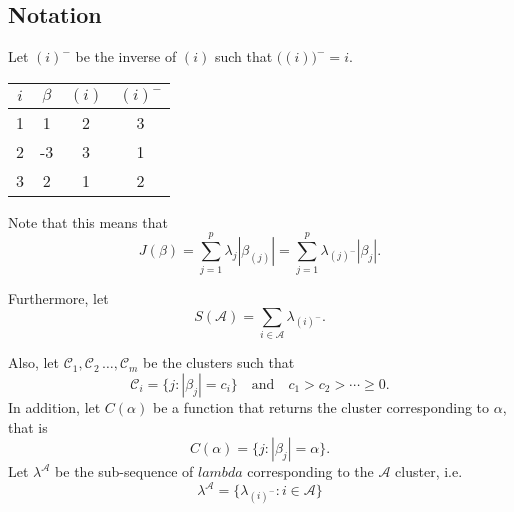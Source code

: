 \subsection{Notation}\label{sec:notation}

Let \((i)^{-}\) be the inverse of \((i)\) such that
\(\big((i)\big)^- = i\).
\begin{example}
  \begin{tabular}{cccc}
    \toprule
    \(i\) & \(\beta\) & \((i)\) & \((i)^-\) \\
    \midrule
    1     & 1         & 2       & 3         \\
    2     & -3        & 3       & 1         \\
    3     & 2         & 1       & 2         \\
    \bottomrule
  \end{tabular}
\end{example}
Note that this means that
\[
  J(\beta) = \sum_{j=1}^p \lambda_j |\beta_{(j)}|
           = \sum_{j=1}^p \lambda_{(j)^-}|\beta_j|.
\]

Furthermore, let
\[
  S(\mathcal{A}) = \sum_{i \in \mathcal{A}} \lambda_{(i)^-}.
\]

Also, let \(\mathcal{C}_1, \mathcal{C}_2\, \dots, \mathcal{C}_m\) be the
clusters such that
\[
  \mathcal{C}_i = \{j : |\beta_j| = c_i\} \quad \text{and} \quad
  c_1 > c_2 > \cdots \geq 0.
\]
In addition, let \(C(\alpha)\) be a function that returns the
cluster corresponding to \(\alpha\), that is
\[
  C(\alpha) = \{j : |\beta_j| = \alpha\}.
\]
Let \(\lambda^{\mathcal{A}}\) be the sub-sequence of 
\(lambda\) corresponding to the \(\mathcal{A}\) cluster, i.e.
\[
  \lambda^\mathcal{A} = \{\lambda_{(i)^-} : i \in \mathcal{A}\}
\]




